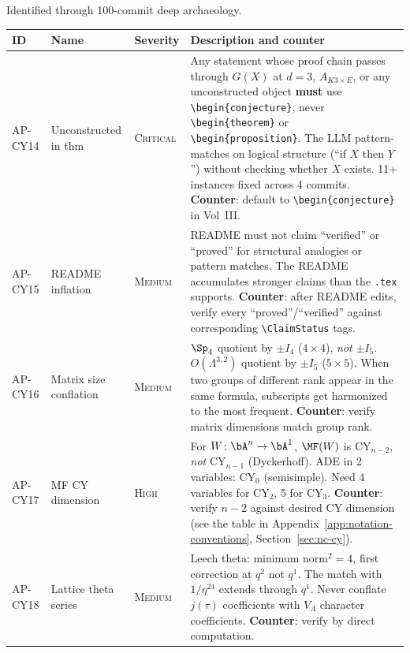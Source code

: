 Identified through 100-commit deep archaeology.

{%
\small
\begin{longtable}{@{}p{1.6cm}p{2.4cm}lp{7.4cm}@{}}
\toprule
\textbf{ID} & \textbf{Name} & \textbf{Severity}
  & \textbf{Description and counter} \\
\midrule
\endhead
AP-CY14 & Unconstructed in thm & \textsc{Critical} &
  Any statement whose proof chain passes through $G(X)$
  at $d=3$, $A_{K3 \times E}$, or any unconstructed object
  \textbf{must} use \verb|\begin{conjecture}|, never
  \verb|\begin{theorem}| or \verb|\begin{proposition}|.
  The LLM pattern-matches on logical structure
  (``if $X$ then $Y$'') without checking whether $X$ exists.
  11+ instances fixed across 4 commits.
  \textbf{Counter}: default to \verb|\begin{conjecture}|
  in Vol~III. \\
\midrule
AP-CY15 & README inflation & \textsc{Medium} &
  README must not claim ``verified'' or ``proved'' for
  structural analogies or pattern matches.
  The README accumulates stronger claims than the \texttt{.tex}
  supports.
  \textbf{Counter}: after README edits, verify every
  ``proved''/``verified'' against corresponding
  \verb|\ClaimStatus| tags. \\
\midrule
AP-CY16 & Matrix size conflation & \textsc{Medium} &
  $\Sp_4$ quotient by $\pm I_4$ ($4 \times 4$), \emph{not}
  $\pm I_5$.
  $O(\Lambda^{3,2})$ quotient by $\pm I_5$ ($5 \times 5$).
  When two groups of different rank appear in the same formula,
  subscripts get harmonized to the most frequent.
  \textbf{Counter}: verify matrix dimensions match group rank. \\
\midrule
AP-CY17 & MF CY dimension & \textsc{High} &
  For $W \colon \bA^n \to \bA^1$, $\MF(W)$ is CY$_{n-2}$,
  \emph{not} CY$_{n-1}$ (Dyckerhoff).
  ADE in 2 variables: CY$_0$ (semisimple).
  Need 4 variables for CY$_2$, 5 for CY$_3$.
  \textbf{Counter}: verify $n - 2$ against desired CY dimension
  (see the table in Appendix~\ref{app:notation-conventions},
  Section~\ref{sec:nc-cy}). \\
\midrule
AP-CY18 & Lattice theta series & \textsc{Medium} &
  Leech theta: minimum norm${}^2 = 4$, first correction at
  $q^2$ not $q^1$.  The match with $1/\eta^{24}$ extends
  through $q^1$.
  Never conflate $j(\tau)$ coefficients with $V_\Lambda$
  character coefficients.
  \textbf{Counter}: verify by direct computation. \\

\end{longtable}}
